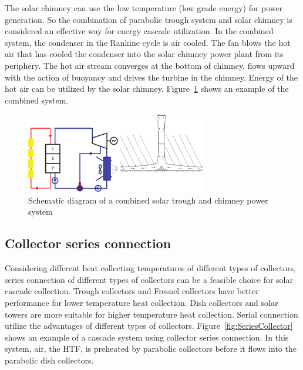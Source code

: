 The solar chimney can use the low temperature (low grade energy) for power generation. So the combination of parabolic trough system and solar chimney is considered an effective way for energy cascade utilization. In the combined system, the condenser in the Rankine cycle is air cooled. The fan blows the hot air that has cooled the condenser into the solar chimney power plant from its periphery. The hot air stream converges at the bottom of chimney, flows upward with the action of buoyancy and drives the turbine in the chimney.
Energy of the hot air can be utilized by the solar chimney. Figure~\ref{fig:CombinedSolarChimney} shows an example of the combined system. 

\begin{figure}[!ht]
\centering 
\includegraphics[width=0.7\textwidth]{fig/CombinedSolarChimney}
\caption{Schematic diagram of a combined solar trough and chimney power system}\label{fig:CombinedSolarChimney}
\end{figure}

\subsection{Collector series connection}
\label{sec:csc}
Considering different heat collecting temperatures of different types of collectors, series connection of different types of collectors can be a feasible choice for solar cascade collection. Trough collectors and Fresnel collectors have better performance for lower temperature heat collection. Dish collectors and solar towers are more suitable for higher temperature heat collection. Serial connection utilize the advantages of different types of collectors. Figure~\ref{fig:SeriesCollector} shows an example of a cascade system using collector series connection. In this system, air, the HTF, is preheated by parabolic collectors before it flows into the parabolic dish collectors.

